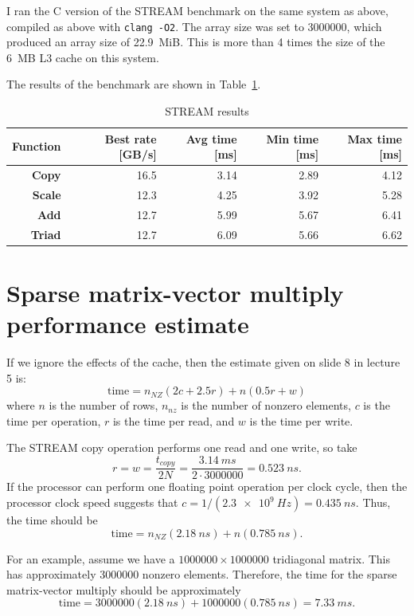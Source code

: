 \documentclass{article}
\begin{document}
I ran the C version of the STREAM benchmark on the same system as above, compiled as above with \texttt{clang -O2}. The array size was set to \num{3000000}, which produced an array size of \SI{22.9}{MiB}. This is more than 4 times the size of the \SI{6}{MB} L3 cache on this system.

The results of the benchmark are shown in Table~\ref{tab:stream}.

\begin{table}[]
\centering
\begin{tabular}{@{}rrrrr@{}}
\toprule
\textbf{Function} & Best rate {[}GB/s{]} & Avg time {[}ms{]} & Min time {[}ms{]} & Max time {[}ms{]} \\ \midrule
\textbf{Copy}     & 16.5                 & 3.14              & 2.89              & 4.12              \\
\textbf{Scale}    & 12.3                 & 4.25              & 3.92              & 5.28              \\
\textbf{Add}      & 12.7                 & 5.99              & 5.67              & 6.41              \\
\textbf{Triad}    & 12.7                 & 6.09              & 5.66              & 6.62              \\ \bottomrule
\end{tabular}
\caption{STREAM results}
\label{tab:stream}
\end{table}

\section{Sparse matrix-vector multiply performance estimate}

If we ignore the effects of the cache, then the estimate given on slide 8 in lecture 5 is:
\begin{equation}
    \text{time} = n_{NZ}(2c + 2.5r) + n (0.5r + w)
\end{equation}
where $n$ is the number of rows, $n_{nz}$ is the number of nonzero elements, $c$ is the time per operation, $r$ is the time per read, and $w$ is the time per write.

The STREAM copy operation performs one read and one write, so take
\[
    r = w = \frac{t_{copy}}{2N} = \frac{\SI{3.14}{ms}}{2 \cdot \num{3000000}} = \SI{0.523}{ns}.
\]
If the processor can perform one floating point operation per clock cycle, then the processor clock speed suggests that $c = 1 / (\SI{2.3e9}{Hz}) = \SI{0.435}{ns}$. Thus, the time should be
\begin{equation}
    \text{time} = n_{NZ}(\SI{2.18}{ns}) + n (\SI{0.785}{ns}).
\end{equation}

For an example, assume we have a $\num{1000000}\times\num{1000000}$ tridiagonal matrix. This has approximately \num{3000000} nonzero elements. Therefore, the time for the sparse matrix-vector multiply should be approximately
\[
    \text{time} = \num{3000000}(\SI{2.18}{ns}) + \num{1000000}(\SI{0.785}{ns}) = \SI{7.33}{ms}.
\]
\end{document}
